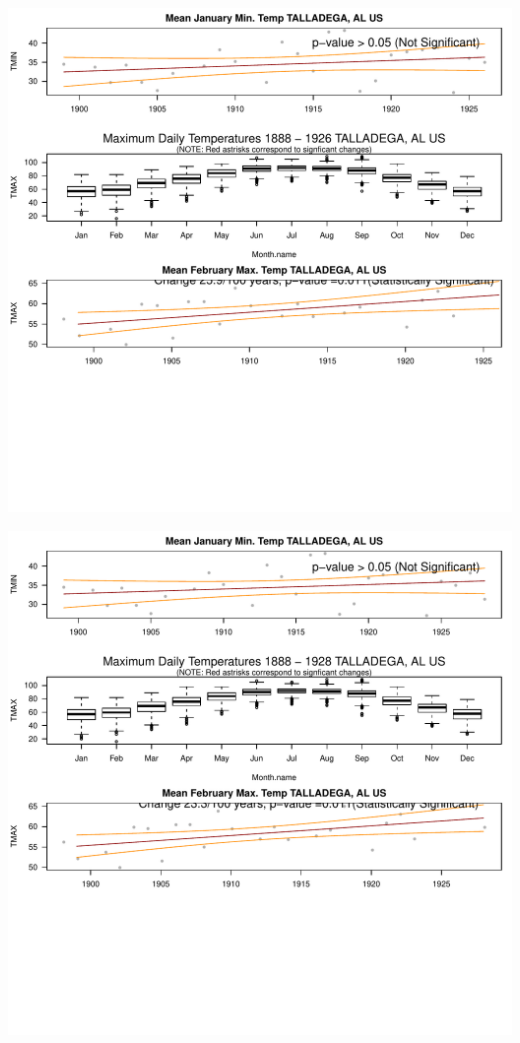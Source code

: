 \documentclass{article}\usepackage[]{graphicx}\usepackage[]{color}
\makeatletter
\def\maxwidth{ %
  \ifdim\Gin@nat@width>\linewidth
    \linewidth
  \else
    \Gin@nat@width
  \fi
}
\newenvironment{knitrout}{}{} %
\makeatother
\begin{document}
\begin{knitrout}
\includegraphics[width=\maxwidth]{figure/static_template-9} 

\includegraphics[width=\maxwidth]{figure/static_template-10} 


\end{knitrout}
\end{document}
